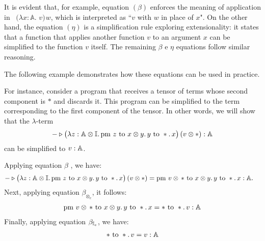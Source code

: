 It is evident that, for example, equation $(\beta)$ enforces the meaning of application in  $(\lambda x : \mathbb{A}.$ $v) \hspace{1pt} w $, which is interpreted as ``$v$ with $w$ in place of $x$".
On the other hand, the equation $(\eta)$ is a simplification rule exploring extensionality: it states that a function that applies another function $v$ to an argument $x$ can be simplified to the function $v$ itself. 
The remaining $\beta$ e $\eta$ equations follow similar reasoning.

The following example demonstrates how these equations can be used in practice.

\begin{example} \label{ex:eq_contex_gen}
 For instance, consider a program that receives a tensor of terms whose second component is $*$ and discards it. This program can be simplified to the term corresponding to the first component of the tensor. In other words, we will show that the $\lambda$-term
\[
 - \triangleright \big(\lambda z : \mathbb{A} \otimes \mathbb{I}.\, \text{pm } z \text{ to } x \otimes y.\, y \text{ to } *.\, x\big)\, (v \otimes *) : \mathbb{A}
\]
can be simplified to $v : \mathbb{A}$.

Applying equation $\beta$ , we have:
\begin{equation*}
  \begin{split}
 - \triangleright \big(\lambda z : \mathbb{A} \otimes \mathbb{I}. \, \text{pm } z \text{ to } x \otimes y. \, y \text{ to } *.\, x \big) \, (v \otimes  *) 
&= \text{pm }  v \otimes \, * \text{ to } x \otimes y. \, y \text{ to } *.\, x  : \mathbb{A}. 
 \end{split}
\end{equation*}
Next, applying  equation $\beta_{\otimes_e}$, it follows:
\begin{align*}
\text{pm }  v \otimes \, * \text{ to } x \otimes y. \, y \text{ to } *.\, x  
=   * \text{ to } *.\, v: \mathbb{A}
\end{align*}
Finally, applying  equation $\beta_{\mathbb{I}_e}$, we have:
\begin{align*}
 * \text{ to } *.\, v = v: \mathbb{A}
\end{align*}

\end{example}





\begin{comment}
\begin{definition}
  Let \( S \) be a set. A \emph{relation} on \( S \) is a subset \( R \subseteq S \times S \). An ordered pair \( (s_1, s_2) \in R \) means that \( s_1 \) is related to \( s_2 \).
\end{definition}
\end{comment}

